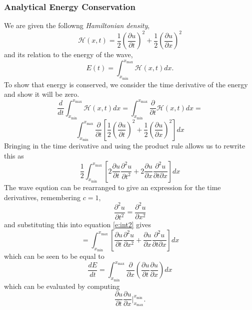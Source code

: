 \documentclass[10pt]{article}
\begin{document}
\subsubsection*{Analytical Energy Conservation}
We are given the followng {\it Hamiltonian density},
\begin{equation}
\mathcal{H}(x,t) = \frac{1}{2}\left( \frac{\partial u}{\partial t}\right)^2
+ \frac{1}{2}\left( \frac{\partial u}{\partial x}\right)^2
\label{e:hd}
\end{equation}
and its relation to the energy of the wave,
\begin{equation}
E(t) = \int_{x_\text{min}}^{x_\text{max}} \mathcal{H}(x,t) dx.
\label{e:energy}
\end{equation}
To show that energy is conserved, we consider the time derivative of the energy and show it
will be zero.
$$ \frac{d}{dt} \int_{x_\text{min}}^{x_\text{max}} \mathcal{H}(x,t)dx =
\int_{x_\text{min}}^{x_\text{max}} \frac{\partial}{\partial t}\mathcal{H}(x,t)dx = $$
\begin{equation}
\int_{x_\text{min}}^{x_\text{max}} \frac{\partial}{\partial t} \left[
\frac{1}{2}\left(\frac{\partial u}{\partial t}\right)^2
+\frac{1}{2}\left(\frac{\partial u}{\partial x}\right)^2\right] dx
\label{e:int7}
\end{equation}
Bringing in the time derivative and using the product rule allows us to rewrite this as
$$
  \frac{1}{2}\int_{x_\text{min}}^{x_\text{max}} \left[
  2\frac{\partial u}{\partial t}\frac{\partial^2 u}{\partial t^2}+
  2\frac{\partial u}{\partial x}\frac{\partial^2 u}{\partial t \partial x}
  \right] dx
$$
The wave eqution can be rearranged to give an expression for the time derivatives, remembering $c=1$,
$$ \frac{\partial^2 u}{\partial t^2} = \frac{\partial^2 u}{\partial x^2}$$
and substituting this into equation \ref{e:int2} gives
$$
  =\int_{x_\text{min}}^{x_\text{max}} \left[
  \frac{\partial u}{\partial t}\frac{\partial^2 u}{\partial x^2}
  +\frac{\partial u}{\partial x}\frac{\partial^2 u}{\partial t \partial x}\right] dx
$$
which can be seen to be equal to
\begin{equation}
  \frac{dE}{dt} =
  \int_{x_\text{min}}^{x_\text{max}} \frac{\partial}{\partial x}\left(\frac{\partial u}{\partial t}
  \frac{\partial u}{\partial x}\right) dx
\label{e:int8}
\end{equation}
which can be evaluated by computing
\begin{equation}
  \frac{\partial u}{\partial t} \frac{\partial u}{\partial x} \Big| ^{x_\text{min}}_{x_\text{max}}.
\label{e:int9}
\end{equation}
\end{document}
